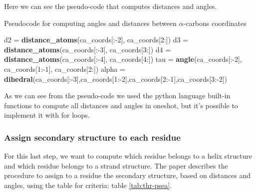 Here we can see the pseudo-code that computes distances and angles.

\begin{algorithm}[ht]
    \caption{Pseudocode for computing angles and distances between $\alpha$-carbons coordinates}\label{alg:two}
    \begin{algorithmic}
        
        \STATE d2 = \textbf{distance\_atoms}(ca\_coords[:-2], ca\_coords[2:])
        \STATE d3 = \textbf{distance\_atoms}(ca\_coords[:-3], ca\_coords[3:])
        \STATE d4 = \textbf{distance\_atoms}(ca\_coords[:-4], ca\_coords[4:])
        \STATE tau = \textbf{angle}(ca\_coords[:-2], ca\_coords[1:-1], ca\_coords[2:])
        \STATE alpha = \textbf{dihedral}(ca\_coords[:-3],ca\_coords[1:-2],ca\_coords[2:-1],ca\_coords[3:-2])
    \end{algorithmic}
\end{algorithm}

As we can see from the pseudo-code we used the python language built-in functions to compute all distances and angles in oneshot, but it's possible to implement it with for loops.

\subsubsection{Assign secondary structure to each residue}
For this last step, we want to compute which residue belongs to a helix structure and which residue belongs to a strand structure.
The paper describes the procedure to assign to a residue the secondary structure, based on distances and angles, using the table for criteria: table \ref{tab:thr-psea}.

